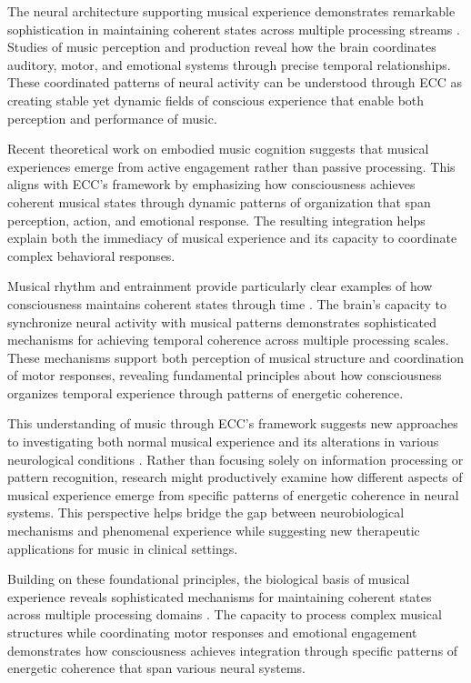 The neural architecture supporting musical experience demonstrates remarkable sophistication in maintaining coherent states across multiple processing streams \cite{Zatorre2007}. Studies of music perception and production reveal how the brain coordinates auditory, motor, and emotional systems through precise temporal relationships. These coordinated patterns of neural activity can be understood through ECC as creating stable yet dynamic fields of conscious experience that enable both perception and performance of music.

Recent theoretical work on embodied music cognition \cite{Krueger2009} suggests that musical experiences emerge from active engagement rather than passive processing. This aligns with ECC's framework by emphasizing how consciousness achieves coherent musical states through dynamic patterns of organization that span perception, action, and emotional response. The resulting integration helps explain both the immediacy of musical experience and its capacity to coordinate complex behavioral responses.

Musical rhythm and entrainment provide particularly clear examples of how consciousness maintains coherent states through time \cite{Clayton2005}. The brain's capacity to synchronize neural activity with musical patterns demonstrates sophisticated mechanisms for achieving temporal coherence across multiple processing scales. These mechanisms support both perception of musical structure and coordination of motor responses, revealing fundamental principles about how consciousness organizes temporal experience through patterns of energetic coherence.

This understanding of music through ECC's framework suggests new approaches to investigating both normal musical experience and its alterations in various neurological conditions \cite{Schaefer2014}. Rather than focusing solely on information processing or pattern recognition, research might productively examine how different aspects of musical experience emerge from specific patterns of energetic coherence in neural systems. This perspective helps bridge the gap between neurobiological mechanisms and phenomenal experience while suggesting new therapeutic applications for music in clinical settings.

Building on these foundational principles, the biological basis of musical experience reveals sophisticated mechanisms for maintaining coherent states across multiple processing domains \cite{Fitch2015}. The capacity to process complex musical structures while coordinating motor responses and emotional engagement demonstrates how consciousness achieves integration through specific patterns of energetic coherence that span various neural systems.


